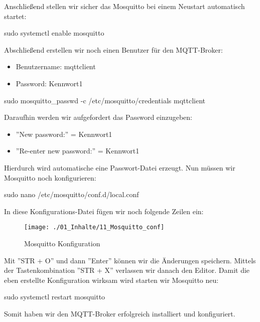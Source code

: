 Anschließend stellen wir sicher das Mosquitto bei einem Neustart automatisch startet:
\begin{Textfeld1}
	sudo systemctl enable mosquitto
\end{Textfeld1}

Abschließend erstellen wir noch einen Benutzer für den MQTT-Broker:
\begin{itemize}
	\item Benutzername: mqttclient
	\item Password: Kennwort1
\end{itemize}
\begin{Textfeld1}
	sudo mosquitto\_passwd -c /etc/mosquitto/credentials mqttclient
\end{Textfeld1}

Daraufhin werden wir aufgefordert das Password einzugeben:
\begin{itemize}
	\item ''New password:'' = Kennwort1
	\item ''Re-enter new password:'' = Kennwort1
\end{itemize}

Hierdurch wird automatische eine Passwort-Datei erzeugt. Nun müssen wir Mosquitto noch konfigurieren:
\begin{Textfeld1}
	sudo nano /etc/mosquitto/conf.d/local.conf
\end{Textfeld1}

\newpage
In diese Konfigurations-Datei fügen wir noch folgende Zeilen ein:
\begin{figure}[H]
	\texttt{[image: ./01\_Inhalte/11\_Mosquitto\_conf]}
	\centering
	\caption{Mosquitto Konfiguration}
\end{figure}

Mit ''STR + O'' und dann ''Enter'' können wir die Änderungen speichern. Mittels der Tastenkombination ''STR + X'' verlassen wir danach den Editor. Damit die eben erstellte Konfiguration wirksam wird starten wir Mosquitto neu:
\begin{Textfeld1}
	sudo systemctl restart mosquitto
\end{Textfeld1}

Somit haben wir den MQTT-Broker erfolgreich installiert und konfiguriert.

